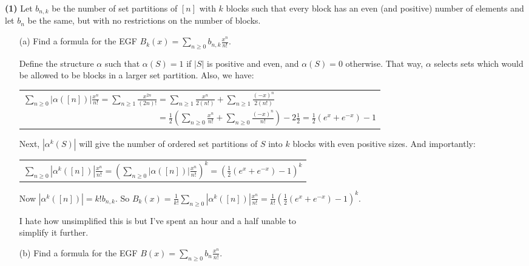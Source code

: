 \documentclass{book}
\newcommand{\exOne}{%
   \color{Purple}%
   \fontsize{13}{15}\selectfont%
}
\newcommand{\exTwo}{%
   \color{Purple}%
   \fontsize{13}{15}\selectfont%
}
\newenvironment{myIndent}{%
   \begin{adjustwidth}{2.5em}{0em}%
}{%
   \end{adjustwidth}%
}
\newcommand{\blab}[1]{\textbf{#1}}
\newcommand{\retTwo}{\hfill\bigbreak}
\begin{document}
\blab{(1)} Let $b_{n,k}$ be the number of set partitions of $[n]$ with $k$ blocks such that every block has an even (and positive) number of elements and let $b_n$ be the same, but with no restrictions on the number of blocks.
\begin{enumerate}
	\item[(a)] Find a formula for the EGF $B_k(x) = \sum\limits_{n \geq 0}b_{n,k}\frac{x^n}{n!}$.
	
	\begin{myIndent}\exOne
		Define the structure $\alpha$ such that $\alpha(S) = 1$ if $|S|$ is positive and even, and $\alpha(S) = 0$ otherwise. That way, $\alpha$ selects sets which would be allowed to be blocks in a larger set partition. Also, we have:

		{\centering\exTwo
		\begin{tabular}{l}
			$\sum\limits_{n \geq 0}|\alpha([n])|\frac{x^n}{n!} = \sum\limits_{n \geq 1}\frac{x^{2n}}{(2n)!} = \sum\limits_{n \geq 1}\frac{x^n}{2(n!)} + \sum\limits_{n \geq 1}\frac{(-x)^n}{2(n!)}$ \\ [14pt]

			$\phantom{\sum\limits_{n \geq 0}|\alpha([n])|\frac{x^n}{n!} = \sum\limits_{n \geq 1}\frac{x^{2n}}{(2n)!}} = \frac{1}{2}(\sum\limits_{n \geq 0}\frac{x^n}{n!} + \sum\limits_{n \geq 0}\frac{(-x)^n}{n!}) - 2\frac{1}{2} = \frac{1}{2}(e^x + e^{-x}) - 1$
		\end{tabular} \retTwo\par}

		Next, $|\alpha^k(S)|$ will give the number of ordered set partitions of $S$ into $k$ blocks with even positive sizes. And importantly:
		
		{\centering\exTwo
		\begin{tabular}{l}
			$\sum\limits_{n \geq 0}|\alpha^k([n])|\frac{x^n}{n!} = \left(\sum\limits_{n \geq 0}|\alpha([n])|\frac{x^n}{n!}\right)^k = (\frac{1}{2}(e^x + e^{-x}) - 1)^k$
		\end{tabular} \retTwo\par}
		
		Now $|\alpha^k([n])| = k! b_{n,k}$. So $B_k(x) = \frac{1}{k!}\sum\limits_{n \geq 0}|\alpha^k([n])|\frac{x^n}{n!} = \frac{1}{k!}(\frac{1}{2}(e^x + e^{-x}) - 1)^k$.\retTwo

		I hate how unsimplified this is but I've spent an hour and a half unable to\\ simplify it further.\retTwo
	\end{myIndent}

	\item[(b)] Find a formula for the EGF $B(x) = \sum\limits_{n \geq 0}b_{n}\frac{x^n}{n!}$.
	

\end{enumerate}
\end{document}
